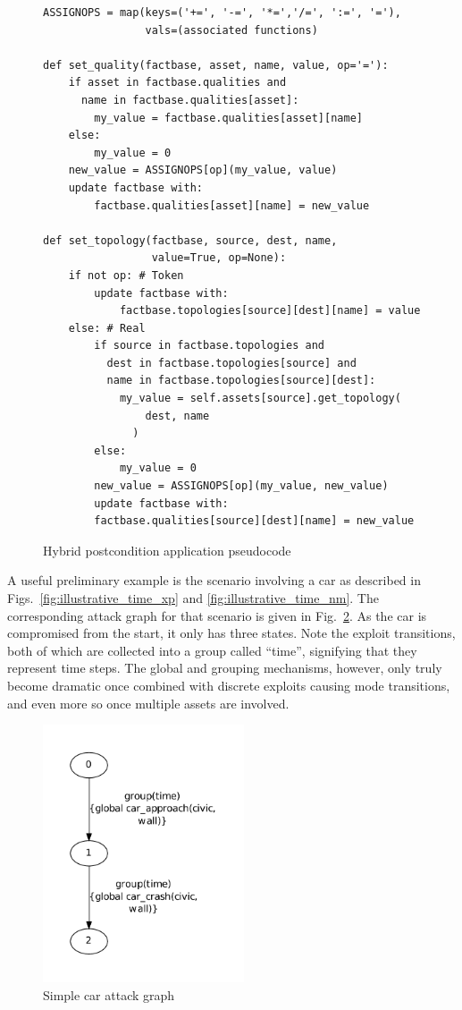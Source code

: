 \begin{figure}
\begin{lstlisting}
ASSIGNOPS = map(keys=('+=', '-=', '*=','/=', ':=', '='),
                vals=(associated functions)

def set_quality(factbase, asset, name, value, op='='):
    if asset in factbase.qualities and
      name in factbase.qualities[asset]:
        my_value = factbase.qualities[asset][name]
    else:
        my_value = 0
    new_value = ASSIGNOPS[op](my_value, value)
    update factbase with:
        factbase.qualities[asset][name] = new_value

def set_topology(factbase, source, dest, name, 
                 value=True, op=None):
    if not op: # Token
        update factbase with:
            factbase.topologies[source][dest][name] = value
    else: # Real
        if source in factbase.topologies and
          dest in factbase.topologies[source] and
          name in factbase.topologies[source][dest]:
            my_value = self.assets[source].get_topology(
                dest, name
              )
        else:
            my_value = 0
        new_value = ASSIGNOPS[op](my_value, new_value)
        update factbase with:
        factbase.qualities[source][dest][name] = new_value
\end{lstlisting}
\caption{Hybrid postcondition application pseudocode}
\label{fig:hybrid-postcondition}
\end{figure}
A useful preliminary example is the scenario involving a car as described in
Figs.~\ref{fig:illustrative_time_xp} and \ref{fig:illustrative_time_nm}. The
corresponding attack graph for that scenario is given in 
Fig.~\ref{fig:fullbunny_simple_ag}. As the car is compromised from the start,
it only has three states. Note the exploit transitions,
both of which are collected into a group called ``time'', signifying that
they represent time steps. The global and grouping mechanisms, however, only 
truly become dramatic once combined with discrete exploits causing mode
transitions, and even more so once multiple assets are involved.
\label{sec:car}

\begin{figure}
\centering
\includegraphics[height=3in]{ag_car/simple/full_bunny_1_ag_5}
\caption{Simple car attack graph}
\label{fig:fullbunny_simple_ag}
\end{figure}

